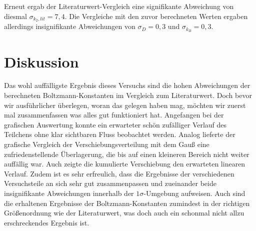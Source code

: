 \documentclass{article}
\begin{document}
Erneut ergab der Literaturwert-Vergleich eine signifikante Abweichung von diesmal $\sigma_{k_2,lit} = 7,4$. Die Vergleiche mit den zuvor berechneten Werten ergaben allerdings insignifikante Abweichungen von $\sigma_D = 0,3$ und $\sigma_{k_B} = 0,3$.

\newpage
\section{Diskussion}

Das wohl auffälligste Ergebnis dieses Versuchs sind die hohen Abweichungen der berechneten Boltzmann-Konstanten im Vergleich zum Literaturwert. Doch bevor wir ausführlicher überlegen, woran das gelegen haben mag, möchten wir zuerst mal zusammenfassen was alles gut funktioniert hat. Angefangen bei der grafischen Auswertung konnte ein erwarteter schön zufälliger Verlauf des Teilchens ohne klar sichtbaren Fluss beobachtet werden. Analog lieferte der grafische Vergleich der Verschiebungsverteilung mit dem Gauß eine zufriedenstellende Überlagerung, die bis auf einen kleineren Bereich nicht weiter auffällig war. Auch zeigte die kumulierte Verschiebung den erwarteten linearen Verlauf. Zudem ist es sehr erfreulich, dass die Ergebnisse der verschiedenen Versuchsteile an sich sehr gut zusammenpassen und zueinander beide insignifikante Abweichungen innerhalb der $1\sigma$-Umgebung aufweisen. Auch sind die erhaltenen Ergebnisse der Boltzmann-Konstanten zumindest in der richtigen Größenordnung wie der Literaturwert, was doch auch ein schonmal nicht allzu erschreckendes Ergebnis ist. 
\end{document}
